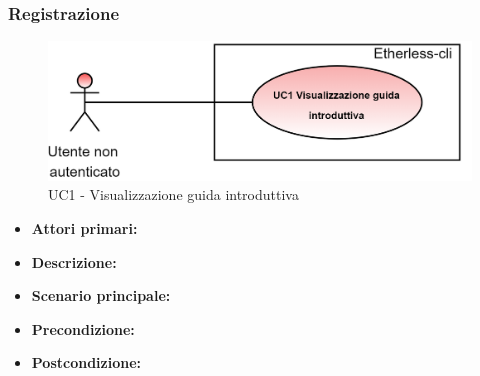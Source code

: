 \subsubsection{Registrazione} 
	\begin{figure}[h]
	\centering
	\includegraphics[scale=0.15]{./res/img/UC1-GuidaIntro.png}
	\caption {UC1 - Visualizzazione guida introduttiva}
\end{figure}
\begin{itemize}
	\item \textbf{Attori primari:}
	\item \textbf{Descrizione:} 
	\item \textbf{Scenario principale:} 
	\item \textbf{Precondizione:} 
	\item \textbf{Postcondizione:} 
\end{itemize}